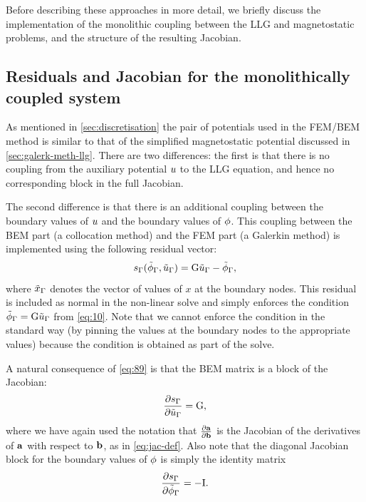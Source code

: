 Before describing these approaches in more detail, we briefly discuss the implementation of the monolithic coupling between the LLG and magnetostatic problems, and the structure of the resulting Jacobian.

\subsection{Residuals and Jacobian for the monolithically coupled system}
\label{sec:bem-jacobian-structure}

As mentioned in \cref{sec:discretisation} the pair of potentials used in the FEM/BEM method is similar to that of the simplified magnetostatic potential discussed in \cref{sec:galerk-meth-llg}.
There are two differences: the first is that there is no coupling from the auxiliary potential $u$ to the LLG equation, and hence no corresponding block in the full Jacobian.

The second difference is that there is an additional coupling between the boundary values of $u$ and the boundary values of $\phi$.
This coupling between the BEM part (a collocation method) and the FEM part (a Galerkin method) is implemented using the following residual vector:
\newcommand{\rphimb}{\rphi_\boundd}
\begin{equation}
  \rphimb(\phimdis_\boundd, \phionedis_\boundd) = \bm \phionedis_\boundd - \phimdis_\boundd,
  \label{eq:89}
\end{equation}
where $\tilde{x}_{\Gamma}$ denotes the vector of values of $x$ at the boundary nodes.
This residual is included as normal in the non-linear solve and simply enforces the condition $\tilde{\phi}_{\Gamma} = {\mathbf{\mathrm{G}}} \tilde{u}_{\Gamma}$ from \cref{eq:10}.
Note that we cannot enforce the condition in the standard way (by pinning the values at the boundary nodes to the appropriate values) because the condition is obtained as part of the solve.

A natural consequence of \cref{eq:89} is that the BEM matrix is a block of the Jacobian:
\begin{equation}
  \pd{\rphimb}{\phionedis_\boundd} = \bm,
  \label{eq:92}
\end{equation}
where we have again used the notation that $\frac{\partial {\boldsymbol{\mathrm{a}}}}{\partial {\boldsymbol{\mathrm{b}}}}$ is the Jacobian of the derivatives of ${\boldsymbol{\mathrm{a}}}$ with respect to ${\boldsymbol{\mathrm{b}}}$, as in \cref{eq:jac-def}.
Also note that the diagonal Jacobian block for the boundary values of $\phi$ is simply the identity matrix
\begin{equation}
  \pd{\rphimb}{\phimdis_\boundd} = -\Idm.
  \label{eq:91}
\end{equation}

